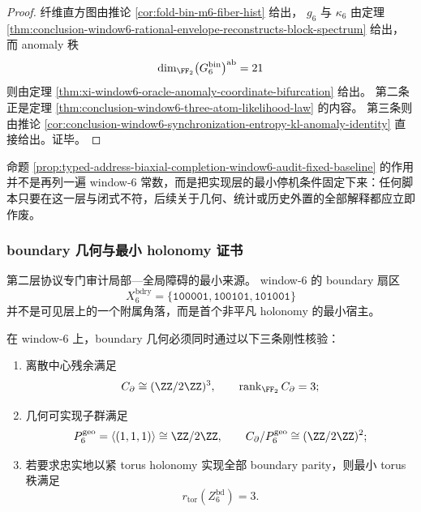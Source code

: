 \begin{proof}
纤维直方图由推论 \ref{cor:fold-bin-m6-fiber-hist} 给出，
\(g_6\) 与 \(\kappa_6\) 由定理 \ref{thm:conclusion-window6-rational-envelope-reconstructs-block-spectrum} 给出，
而 anomaly 秩
\[
\dim_{\FF_2}\bigl(G_6^{\mathrm{bin}}\bigr)^{\mathrm{ab}}=21
\]
则由定理 \ref{thm:xi-window6-oracle-anomaly-coordinate-bifurcation} 给出。
第二条正是定理 \ref{thm:conclusion-window6-three-atom-likelihood-law} 的内容。
第三条则由推论 \ref{cor:conclusion-window6-synchronization-entropy-kl-anomaly-identity} 直接给出。证毕。
\end{proof}

命题 \ref{prop:typed-address-biaxial-completion-window6-audit-fixed-baseline} 的作用并不是再列一遍 window-\(6\) 常数，而是把实现层的最小停机条件固定下来：任何脚本只要在这一层与闭式不符，后续关于几何、统计或历史外置的全部解释都应立即作废。

\subsubsection{boundary 几何与最小 holonomy 证书}\label{subsubsec:typed-address-biaxial-completion-window6-numerical-audit-boundary-holonomy-certificates}
第二层协议专门审计局部—全局障碍的最小来源。
window-\(6\) 的 boundary 扇区
\[
X_6^{\mathrm{bdry}}=\{\texttt{100001},\texttt{100101},\texttt{101001}\}
\]
并不是可见层上的一个附属角落，而是首个非平凡 holonomy 的最小宿主。

\begin{proposition}\label{prop:typed-address-biaxial-completion-window6-audit-boundary-certificates}
在 window-\(6\) 上，boundary 几何必须同时通过以下三条刚性核验：
\begin{enumerate}
  \item 离散中心残余满足
  \[
  C_{\partial}\cong (\ZZ/2\ZZ)^3,
  \qquad
  \operatorname{rank}_{\FF_2}C_{\partial}=3;
  \]
  \item 几何可实现子群满足
  \[
  P_6^{\mathrm{geo}}=\langle(1,1,1)\rangle\cong \ZZ/2\ZZ,
  \qquad
  C_{\partial}/P_6^{\mathrm{geo}}\cong (\ZZ/2\ZZ)^2;
  \]
  \item 若要求忠实地以紧 torus holonomy 实现全部 boundary parity，则最小 torus 秩满足
  \[
  r_{\mathrm{tor}}(Z_6^{\mathrm{bd}})=3.
  \]
\end{enumerate}
\end{proposition}

